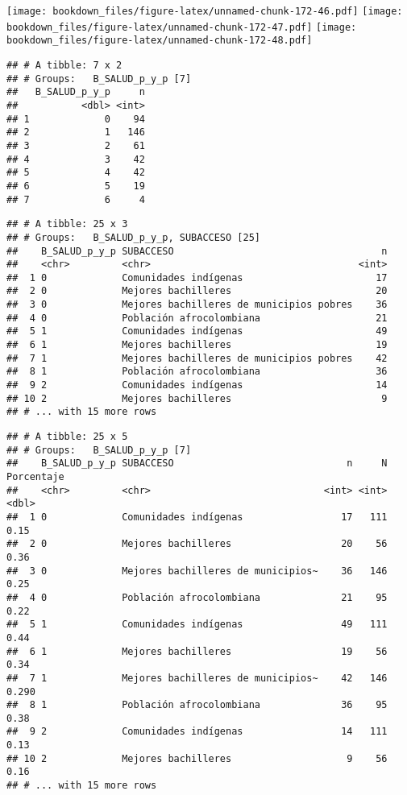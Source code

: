 \documentclass[]{article}
\theoremstyle{definition}
\theoremstyle{definition}
\theoremstyle{definition}
\theoremstyle{remark}
\begin{document}
\texttt{[image: bookdown\_files/figure-latex/unnamed-chunk-172-46.pdf]}
\texttt{[image: bookdown\_files/figure-latex/unnamed-chunk-172-47.pdf]}
\texttt{[image: bookdown\_files/figure-latex/unnamed-chunk-172-48.pdf]}

\begin{verbatim}
## # A tibble: 7 x 2
## # Groups:   B_SALUD_p_y_p [7]
##   B_SALUD_p_y_p     n
##           <dbl> <int>
## 1             0    94
## 2             1   146
## 3             2    61
## 4             3    42
## 5             4    42
## 6             5    19
## 7             6     4
\end{verbatim}

\begin{verbatim}
## # A tibble: 25 x 3
## # Groups:   B_SALUD_p_y_p, SUBACCESO [25]
##    B_SALUD_p_y_p SUBACCESO                                    n
##    <chr>         <chr>                                    <int>
##  1 0             Comunidades indígenas                       17
##  2 0             Mejores bachilleres                         20
##  3 0             Mejores bachilleres de municipios pobres    36
##  4 0             Población afrocolombiana                    21
##  5 1             Comunidades indígenas                       49
##  6 1             Mejores bachilleres                         19
##  7 1             Mejores bachilleres de municipios pobres    42
##  8 1             Población afrocolombiana                    36
##  9 2             Comunidades indígenas                       14
## 10 2             Mejores bachilleres                          9
## # ... with 15 more rows
\end{verbatim}

\begin{verbatim}
## # A tibble: 25 x 5
## # Groups:   B_SALUD_p_y_p [7]
##    B_SALUD_p_y_p SUBACCESO                              n     N Porcentaje
##    <chr>         <chr>                              <int> <int>      <dbl>
##  1 0             Comunidades indígenas                 17   111      0.15 
##  2 0             Mejores bachilleres                   20    56      0.36 
##  3 0             Mejores bachilleres de municipios~    36   146      0.25 
##  4 0             Población afrocolombiana              21    95      0.22 
##  5 1             Comunidades indígenas                 49   111      0.44 
##  6 1             Mejores bachilleres                   19    56      0.34 
##  7 1             Mejores bachilleres de municipios~    42   146      0.290
##  8 1             Población afrocolombiana              36    95      0.38 
##  9 2             Comunidades indígenas                 14   111      0.13 
## 10 2             Mejores bachilleres                    9    56      0.16 
## # ... with 15 more rows
\end{verbatim}
\end{document}
